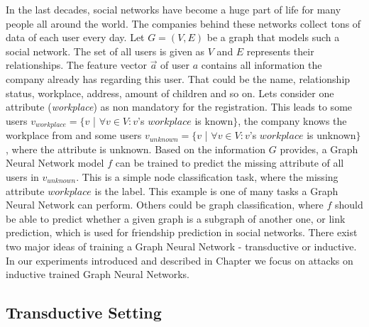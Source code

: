     In the last decades, social networks have become a huge part of life for many people all around the world.
    The companies behind these networks collect tons of data of each user every day.
    Let $G = (V, E)$ be a graph that models such a social network. 
    The set of all users is given as $V$ and $E$ represents their relationships.
    The feature vector $\overrightarrow{a}$ of user $a$ contains all information the company already has regarding this user.
    That could be the name, relationship status, workplace, address, amount of children and so on.
    Lets consider one attribute (\emph{workplace}) as non mandatory for the registration.
    This leads to some users $v_{workplace} = \{v $ | $ \forall v \in V: v$'s $workplace$ is known$\}$, the company knows the workplace from and some users $v_{unknown} = \{v $ | $ \forall v \in V: v$'s $workplace$ is unknown$\}$, where the attribute is unknown.
    Based on the information $G$ provides, a Graph Neural Network model $f$ can be trained to predict the missing attribute of all users in $v_{unknown}$.
    This is a simple node classification task, where the missing attribute $workplace$ is the label.
    This example is one of many tasks a Graph Neural Network can perform.
    Others could be graph classification, where $f$ should be able to predict whether a given graph is a subgraph of another one, or link prediction, which is used for friendship prediction in social networks.
    There exist two major ideas of training a Graph Neural Network - transductive or inductive.
    In our experiments introduced and described in Chapter  we focus on attacks on inductive trained Graph Neural Networks. 

    \subsection*{Transductive Setting}

